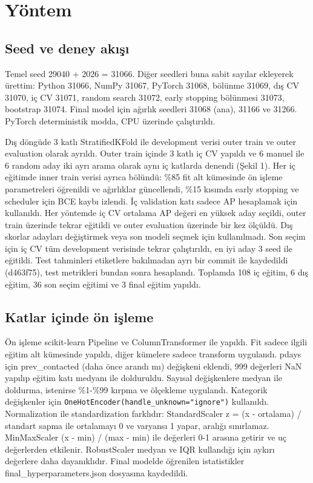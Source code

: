 \documentclass[10.5pt,a4paper]{article}
\begin{document}
\section{Yöntem}
\subsection{Seed ve deney akışı}
Temel seed 29040 + 2026 = 31066. Diğer seedleri buna sabit sayılar ekleyerek ürettim: Python 31066, NumPy 31067, PyTorch 31068, bölünme 31069, dış CV 31070, iç CV 31071, random search 31072, early stopping bölünmesi 31073, bootstrap 31074. Final model için ağırlık seedleri 31068 (ana), 31166 ve 31266. PyTorch deterministik modda, CPU üzerinde çalıştırıldı.

Dış döngüde 3 katlı StratifiedKFold ile development verisi outer train ve outer evaluation olarak ayrıldı. Outer train içinde 3 katlı iç CV yapıldı ve 6 manuel ile 6 random aday iki ayrı arama olarak aynı iç katlarda denendi (Şekil 1).
Her iç eğitimde inner train verisi ayrıca bölündü: \%85 fit alt kümesinde ön işleme parametreleri öğrenildi ve ağırlıklar güncellendi, \%15 kısımda early stopping ve scheduler için BCE kaybı izlendi. İç validation katı sadece AP hesaplamak için kullanıldı.
Her yöntemde iç CV ortalama AP değeri en yüksek aday seçildi, outer train üzerinde tekrar eğitildi ve outer evaluation üzerinde bir kez ölçüldü. Dış skorlar adayları değiştirmek veya son modeli seçmek için kullanılmadı.
Son seçim için iç CV tüm development verisinde tekrar çalıştırıldı, en iyi aday 3 seed ile eğitildi. Test tahminleri etiketlere bakılmadan ayrı bir commit ile kaydedildi (d463f75), test metrikleri bundan sonra hesaplandı.
Toplamda 108 iç eğitim, 6 dış eğitim, 36 son seçim eğitimi ve 3 final eğitim yapıldı.

\subsection{Katlar içinde ön işleme}
Ön işleme scikit-learn Pipeline ve ColumnTransformer ile yapıldı. Fit sadece ilgili eğitim alt kümesinde yapıldı, diğer kümelere sadece transform uygulandı.
pdays için prev\_contacted (daha önce arandı mı) değişkeni eklendi, 999 değerleri NaN yapılıp eğitim katı medyanı ile dolduruldu. Sayısal değişkenlere medyan ile doldurma, istenirse \%1-\%99 kırpma ve ölçekleme uygulandı. Kategorik değişkenler için \texttt{OneHotEncoder(handle\_unknown="ignore")} kullanıldı.
Normalization ile standardization farklıdır: StandardScaler z = (x - ortalama) / standart sapma ile ortalamayı 0 ve varyansı 1 yapar, aralığı sınırlamaz. MinMaxScaler (x - min) / (max - min) ile değerleri 0-1 arasına getirir ve uç değerlerden etkilenir. RobustScaler medyan ve IQR kullandığı için aykırı değerlere daha dayanıklıdır.
Final modelde öğrenilen istatistikler final\_hyperparameters.json dosyasına kaydedildi.
\end{document}
